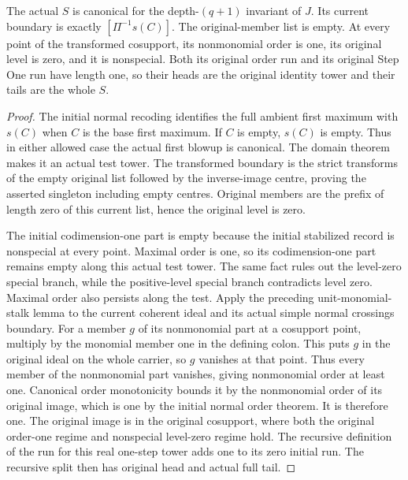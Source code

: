 \begin{lemma}
\label{hir:disjoint-first-step-upper-clocks}
\leanok
The actual $S$ is canonical for the depth-$(q+1)$ invariant of $J$.
Its current boundary is exactly $[\Pi^{-1}s(C)]$. The original-member list
is empty. At every point of the transformed cosupport, its nonmonomial
order is one, its original level is zero, and it is nonspecial. Both its
original order run and its original Step One run have length one, so their
heads are the original identity tower and their tails are the whole $S$.
\end{lemma}
\begin{proof}
The initial normal recoding identifies the full ambient first maximum
with $s(C)$ when $C$ is the base first maximum. If $C$ is empty, $s(C)$ is
empty. Thus in either allowed case the actual first blowup is canonical.
The domain theorem makes it an actual test tower. The transformed boundary
is the strict transforms of the empty original list followed by the
inverse-image centre, proving the asserted singleton including empty centres.
Original members are the prefix of length zero of this current list, hence
the original level is zero.

The initial codimension-one part is empty because the initial stabilized
record is nonspecial at every point. Maximal order is one, so its
codimension-one part remains empty along this actual test tower. The same
fact rules out the level-zero special branch, while the positive-level
special branch contradicts level zero. Maximal order also persists along
the test. Apply the preceding unit-monomial-stalk lemma to the current
coherent ideal and its actual simple normal crossings boundary. For a member
$g$ of its nonmonomial part at a cosupport point, multiply by the monomial
member one in the defining colon. This puts $g$ in the original ideal on
the whole carrier, so $g$ vanishes at that point. Thus every member of the
nonmonomial part vanishes, giving nonmonomial order at least one. Canonical order
monotonicity bounds it by the nonmonomial order of its original image,
which is one by the initial normal order theorem. It is therefore one.
The original image is in the original cosupport, where both the original
order-one regime and nonspecial level-zero regime hold. The recursive
definition of the run for this real one-step tower adds one to its zero
initial run. The recursive split then has original head and actual full tail.
\end{proof}

